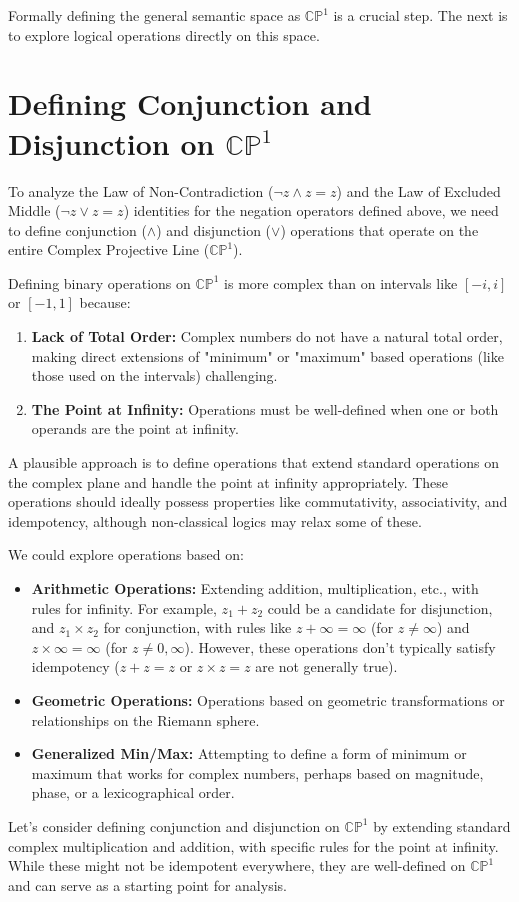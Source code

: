 \documentclass{article}
\begin{document}
	Formally defining the general semantic space as $\mathbb{CP}^1$ is a crucial step. The next is to explore logical operations directly on this space.
	
	\section{Defining Conjunction and Disjunction on $\mathbb{CP}^1$}
	
	To analyze the Law of Non-Contradiction ($\neg z \wedge z = z$) and the Law of Excluded Middle ($\neg z \vee z = z$) identities for the negation operators defined above, we need to define conjunction ($\wedge$) and disjunction ($\vee$) operations that operate on the entire Complex Projective Line ($\mathbb{CP}^1$).
	
	Defining binary operations on $\mathbb{CP}^1$ is more complex than on intervals like $[-i, i]$ or $[-1, 1]$ because:
	
	\begin{enumerate}
		\item \textbf{Lack of Total Order:} Complex numbers do not have a natural total order, making direct extensions of "minimum" or "maximum" based operations (like those used on the intervals) challenging.
		
		\item \textbf{The Point at Infinity:} Operations must be well-defined when one or both operands are the point at infinity.
	\end{enumerate}
	A plausible approach is to define operations that extend standard operations on the complex plane and handle the point at infinity appropriately. These operations should ideally possess properties like commutativity, associativity, and idempotency, although non-classical logics may relax some of these.
	
	We could explore operations based on:
	
	\begin{itemize}
		\item \textbf{Arithmetic Operations:} Extending addition, multiplication, etc., with rules for infinity. For example, $z_1 + z_2$ could be a candidate for disjunction, and $z_1 \times z_2$ for conjunction, with rules like $z + \infty = \infty$ (for $z \neq \infty$) and $z \times \infty = \infty$ (for $z \neq 0, \infty$). However, these operations don't typically satisfy idempotency ($z+z=z$ or $z \times z=z$ are not generally true).
		
		\item \textbf{Geometric Operations:} Operations based on geometric transformations or relationships on the Riemann sphere.
		
		\item \textbf{Generalized Min/Max:} Attempting to define a form of minimum or maximum that works for complex numbers, perhaps based on magnitude, phase, or a lexicographical order.
	\end{itemize}
	Let's consider defining conjunction and disjunction on $\mathbb{CP}^1$ by extending standard complex multiplication and addition, with specific rules for the point at infinity. While these might not be idempotent everywhere, they are well-defined on $\mathbb{CP}^1$ and can serve as a starting point for analysis.
	
\end{document}
